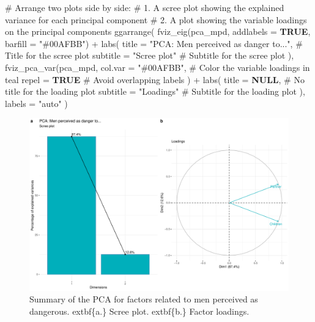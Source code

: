 \documentclass[
  bookmarksnumbered]{article}
\newenvironment{Shaded}{\begin{snugshade}}{\end{snugshade}}
\newcommand{\AttributeTok}[1]{\textcolor[rgb]{0.80,0.80,0.80}{#1}}
\newcommand{\CommentTok}[1]{\textcolor[rgb]{0.50,0.62,0.50}{#1}}
\newcommand{\ConstantTok}[1]{\textcolor[rgb]{0.86,0.64,0.64}{\textbf{#1}}}
\newcommand{\FunctionTok}[1]{\textcolor[rgb]{0.94,0.94,0.56}{#1}}
\newcommand{\NormalTok}[1]{\textcolor[rgb]{0.80,0.80,0.80}{#1}}
\newcommand{\SpecialCharTok}[1]{\textcolor[rgb]{0.86,0.64,0.64}{#1}}
\newcommand{\StringTok}[1]{\textcolor[rgb]{0.80,0.58,0.58}{#1}}
\begin{document}
\begin{Shaded}
\begin{Highlighting}[]
\CommentTok{\# Arrange two plots side by side: }
\CommentTok{\# 1. A scree plot showing the explained variance for each principal component}
\CommentTok{\# 2. A plot showing the variable loadings on the principal components}
\FunctionTok{ggarrange}\NormalTok{(}
  \FunctionTok{fviz\_eig}\NormalTok{(pca\_mpd, }\AttributeTok{addlabels =} \ConstantTok{TRUE}\NormalTok{, }\AttributeTok{barfill =} \StringTok{"\#00AFBB"}\NormalTok{) }\SpecialCharTok{+}
    \FunctionTok{labs}\NormalTok{(}
      \AttributeTok{title =} \StringTok{"PCA: Men perceived as danger to..."}\NormalTok{, }\CommentTok{\# Title for the scree plot}
      \AttributeTok{subtitle =} \StringTok{"Scree plot"}  \CommentTok{\# Subtitle for the scree plot}
\NormalTok{    ),}
  \FunctionTok{fviz\_pca\_var}\NormalTok{(pca\_mpd,}
    \AttributeTok{col.var =} \StringTok{"\#00AFBB"}\NormalTok{, }\CommentTok{\# Color the variable loadings in teal}
    \AttributeTok{repel =} \ConstantTok{TRUE} \CommentTok{\# Avoid overlapping labels}
\NormalTok{  ) }\SpecialCharTok{+}
    \FunctionTok{labs}\NormalTok{(}
      \AttributeTok{title =} \ConstantTok{NULL}\NormalTok{, }\CommentTok{\# No title for the loading plot}
      \AttributeTok{subtitle =} \StringTok{"Loadings"} \CommentTok{\# Subtitle for the loading plot}
\NormalTok{    ),}
  \AttributeTok{labels =} \StringTok{"auto"}
\NormalTok{)}
\end{Highlighting}
\end{Shaded}

\begin{figure}
\centering
\includegraphics{Supplementary_material_files/figure-latex/pca-mpd-plot-1.pdf}
\caption{\label{fig:pca-mpd-plot}Summary of the PCA for factors related to men perceived as dangerous. extbf\{a.\} Scree plot. extbf\{b.\} Factor loadings.}
\end{figure}
\end{document}
